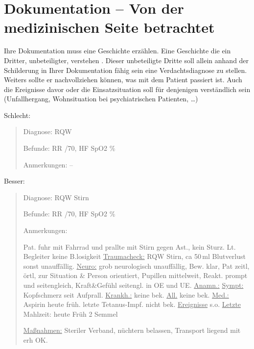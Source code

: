 \section{Dokumentation -- Von der medizinischen Seite
betrachtet}

Ihre Dokumentation muss eine Geschichte erzählen. Eine
Geschichte die ein Dritter, unbeteiligter, verstehen
. Dieser unbeteiligte Dritte soll allein anhand der
Schilderung in Ihrer Dokumentation fähig sein eine
Verdachtsdiagnose zu stellen. Weiters sollte er
nachvollziehen können, was mit dem Patient passiert ist.
Auch die Ereignisse davor oder die Einsatzsituation soll
für denjenigen verständlich sein (Unfallhergang,
Wohnsituation bei psychiatrischen Patienten, \ldots)

Schlecht:
\begin{quote}

{\sffamily Diagnose:} {\ttfamily RQW}

{\sffamily Befunde:} {\sffamily RR} {/70,}
{\sffamily HF} {} {\sffamily SpO2}
{\% }

{\sffamily Anmerkungen: --}
\end{quote}

Besser:

\begin{quote}
{\sffamily Diagnose:} {\ttfamily RQW Stirn}

{\sffamily Befunde:} {\sffamily RR} {/70,}
{\sffamily HF} {} {\sffamily SpO2}
{\% }

{\sffamily Anmerkungen:} {\ttfamily Pat. fuhr mit Fahrrad
und prallte mit Stirn gegen Ast., kein Sturz. Lt. Begleiter
keine B.losigkeit \underline{Traumacheck:} RQW Stirn,
ca 50\,ml Blutverlust sonst unauffällig. \underline{Neuro:}
grob neurologisch unauffällig, Bew. klar, Pat zeitl, örtl, zur Situation \& Person orientiert, Pupillen
mittelweit, Reakt. prompt und seitengleich, Kraft\&Gefühl
seitengl. in OE und UE. \underline{Anamn.:} \underline{Sympt:} Kopfschmerz seit
Aufprall. \underline{Krankh.:} keine bek. \underline{All.}
keine bek. \underline{Med.:} Aspirin heute früh. letzte
Tetanus-Impf. nicht bek. \underline{Ereignisse} s.o.
\underline{Letzte} Mahlzeit: heute Früh 2 Semmel 

\underline{Maßnahmen:} Steriler Verband, nüchtern belassen,
Transport liegend mit erh OK.}
\end{quote}

